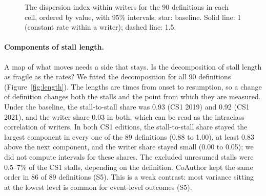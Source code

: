 \begin{figure}[t]
\centering
{}
\caption{The dispersion index within writers for the 90 definitions in each cell, ordered by value, with 95\%
intervals; star: baseline. Solid line: 1 (constant rate within a writer); dashed line: 1.5.}
\label{fig:phi}
\end{figure}

\paragraph{Components of stall length.}
\label{sec:res-length}
A map of what moves needs a side that stays. Is the decomposition of stall length as fragile as the rates? We fitted
the decomposition for all 90 definitions (Figure~\ref{fig:length}). The lengths are times from onset to resumption, so
a change of definition changes both the stalls and the point from which they are measured. Under the baseline, the stall-to-stall share was
0.93 (CS1 2019) and 0.92 (CS1 2021), and the writer share 0.03 in both, which can be read as the intraclass correlation
of writers. In both CS1 editions, the stall-to-stall share stayed the largest component in every one of the 89
definitions (0.88 to 1.00), at least 0.83 above the next component, and the writer share stayed small (0.00 to 0.05);
we did not compute intervals for these shares. The excluded unresumed stalls were 0.5--7\% of the CS1
stalls, depending on the definition. CoAuthor kept the same order in 86 of 89 definitions (S5). This is a weak contrast: most variance sitting at the lowest level is common for event-level
outcomes (S5).

